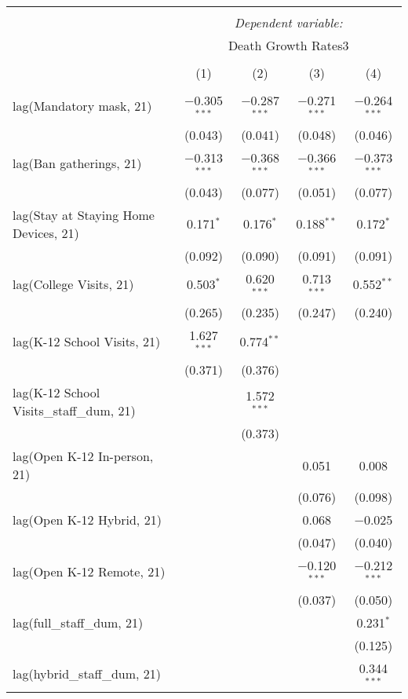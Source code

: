 \begin{tabular}{@{\extracolsep{1pt}}lcccc} 
\\[-1.8ex]\hline 
\hline \\[-1.8ex] 
 & \multicolumn{4}{c}{\textit{Dependent variable:}} \\ 
\cline{2-5} 
 & \multicolumn{4}{c}{Death Growth Rates3} \\ 
\\[-1.8ex] & (1) & (2) & (3) & (4)\\ 
\hline \\[-1.8ex] 
 lag(Mandatory mask, 21) & $-$0.305$^{***}$ & $-$0.287$^{***}$ & $-$0.271$^{***}$ & $-$0.264$^{***}$ \\ 
  & (0.043) & (0.041) & (0.048) & (0.046) \\ 
  lag(Ban gatherings, 21) & $-$0.313$^{***}$ & $-$0.368$^{***}$ & $-$0.366$^{***}$ & $-$0.373$^{***}$ \\ 
  & (0.043) & (0.077) & (0.051) & (0.077) \\ 
  lag(Stay at Staying Home Devices, 21) & 0.171$^{*}$ & 0.176$^{*}$ & 0.188$^{**}$ & 0.172$^{*}$ \\ 
  & (0.092) & (0.090) & (0.091) & (0.091) \\ 
  lag(College Visits, 21) & 0.503$^{*}$ & 0.620$^{***}$ & 0.713$^{***}$ & 0.552$^{**}$ \\ 
  & (0.265) & (0.235) & (0.247) & (0.240) \\ 
  lag(K-12 School Visits, 21) & 1.627$^{***}$ & 0.774$^{**}$ &  &  \\ 
  & (0.371) & (0.376) &  &  \\ 
  lag(K-12 School Visits\_staff\_dum, 21) &  & 1.572$^{***}$ &  &  \\ 
  &  & (0.373) &  &  \\ 
  lag(Open K-12 In-person, 21) &  &  & 0.051 & 0.008 \\ 
  &  &  & (0.076) & (0.098) \\ 
  lag(Open K-12 Hybrid, 21) &  &  & 0.068 & $-$0.025 \\ 
  &  &  & (0.047) & (0.040) \\ 
  lag(Open K-12 Remote, 21) &  &  & $-$0.120$^{***}$ & $-$0.212$^{***}$ \\ 
  &  &  & (0.037) & (0.050) \\ 
  lag(full\_staff\_dum, 21) &  &  &  & 0.231$^{*}$ \\ 
  &  &  &  & (0.125) \\ 
  lag(hybrid\_staff\_dum, 21) &  &  &  & 0.344$^{***}$ \\ 

\end{tabular}
